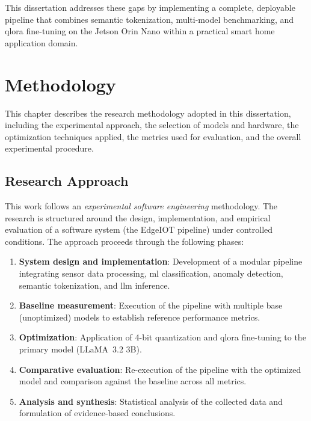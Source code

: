 \documentclass[12pt,a4paper,oneside]{report}
\begin{document}
This dissertation addresses these gaps by implementing a complete, deployable pipeline that combines semantic tokenization, multi-model benchmarking, and \gls{qlora} fine-tuning on the Jetson Orin Nano within a practical smart home application domain.

\chapter{Methodology}
\label{ch:methodology}

This chapter describes the research methodology adopted in this dissertation, including the experimental approach, the selection of models and hardware, the optimization techniques applied, the metrics used for evaluation, and the overall experimental procedure.


\section{Research Approach}
\label{sec:meth-approach}

This work follows an \textit{experimental software engineering} methodology. The research is structured around the design, implementation, and empirical evaluation of a software system (the EdgeIOT pipeline) under controlled conditions. The approach proceeds through the following phases:

\begin{enumerate}
    \item \textbf{System design and implementation}: Development of a modular pipeline integrating sensor data processing, \gls{ml} classification, anomaly detection, semantic tokenization, and \gls{llm} inference.
    \item \textbf{Baseline measurement}: Execution of the pipeline with multiple base (unoptimized) models to establish reference performance metrics.
    \item \textbf{Optimization}: Application of 4-bit quantization and \gls{qlora} fine-tuning to the primary model (LLaMA~3.2 3B).
    \item \textbf{Comparative evaluation}: Re-execution of the pipeline with the optimized model and comparison against the baseline across all metrics.
    \item \textbf{Analysis and synthesis}: Statistical analysis of the collected data and formulation of evidence-based conclusions.
\end{enumerate}
\end{document}
